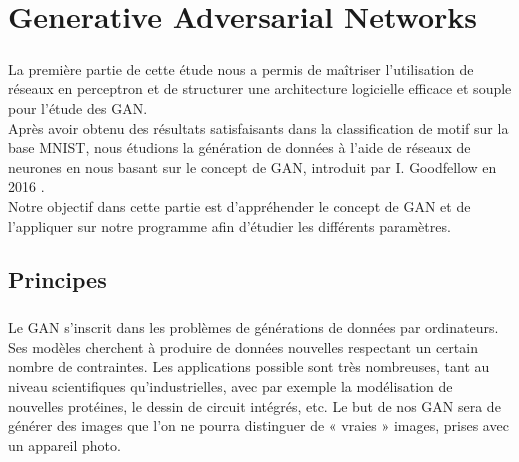

%

\chapter{Generative Adversarial Networks}

\paragraph{}
	La première partie de cette étude nous a permis de maîtriser l'utilisation de réseaux en perceptron et de structurer une architecture logicielle efficace et souple pour l'étude des GAN. \\
	Après avoir obtenu des résultats satisfaisants dans la classification de motif sur la base MNIST, nous étudions la génération de données à l'aide de réseaux de neurones en nous basant sur le concept de GAN, introduit par I. Goodfellow en 2016 \cite{nips-2014}.\\
	Notre objectif dans cette partie est d’appréhender le concept de GAN et de l'appliquer sur notre programme afin d'étudier les différents paramètres. 
\section{Principes}
	\paragraph{}
		Le GAN s'inscrit dans les problèmes de générations de données par ordinateurs. Ses modèles cherchent à produire de données nouvelles respectant un certain nombre de contraintes. Les applications possible sont très nombreuses, tant au niveau scientifiques qu'industrielles, avec par exemple la modélisation de nouvelles protéines, le dessin de circuit intégrés, etc. 
		Le but de nos GAN sera de générer des images que l’on ne pourra distinguer de « vraies » images, prises avec un appareil photo.\\

